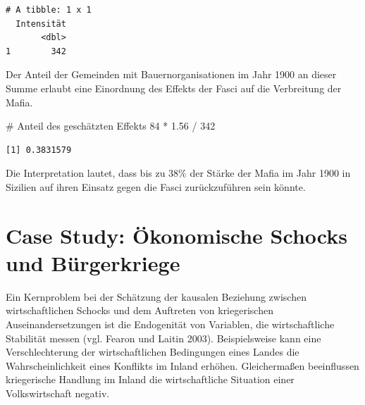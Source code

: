 \documentclass[
  a4paper,
  DIV=11,
  oneside]{scrreprt}
\newenvironment{Shaded}{\begin{snugshade}}{\end{snugshade}}
\newcommand{\CommentTok}[1]{\textcolor[rgb]{0.37,0.37,0.37}{#1}}
\newcommand{\DecValTok}[1]{\textcolor[rgb]{0.68,0.00,0.00}{#1}}
\newcommand{\FloatTok}[1]{\textcolor[rgb]{0.68,0.00,0.00}{#1}}
\newcommand{\SpecialCharTok}[1]{\textcolor[rgb]{0.37,0.37,0.37}{#1}}
\begin{document}
\begin{verbatim}
# A tibble: 1 x 1
  Intensität
       <dbl>
1        342
\end{verbatim}

Der Anteil der Gemeinden mit Bauernorganisationen im Jahr 1900 an dieser
Summe erlaubt eine Einordnung des Effekts der Fasci auf die Verbreitung
der Mafia.

\begin{Shaded}
\begin{Highlighting}[]
\CommentTok{\# Anteil des geschätzten Effekts}
\DecValTok{84} \SpecialCharTok{*} \FloatTok{1.56} \SpecialCharTok{/} \DecValTok{342}
\end{Highlighting}
\end{Shaded}

\begin{verbatim}
[1] 0.3831579
\end{verbatim}

Die Interpretation lautet, dass bis zu 38\% der Stärke der Mafia im Jahr
1900 in Sizilien auf ihren Einsatz gegen die Fasci zurückzuführen sein
könnte.

\section{Case Study: Ökonomische Schocks und
Bürgerkriege}\label{case-study-uxf6konomische-schocks-und-buxfcrgerkriege}

Ein Kernproblem bei der Schätzung der kausalen Beziehung zwischen
wirtschaftlichen Schocks und dem Auftreten von kriegerischen
Auseinandersetzungen ist die Endogenität von Variablen, die
wirtschaftliche Stabilität messen (vgl. Fearon und Laitin 2003).
Beispielsweise kann eine Verschlechterung der wirtschaftlichen
Bedingungen eines Landes die Wahrscheinlichkeit eines Konflikts im
Inland erhöhen. Gleichermaßen beeinflussen kriegerische Handlung im
Inland die wirtschaftliche Situation einer Volkswirtschaft negativ.
\end{document}
